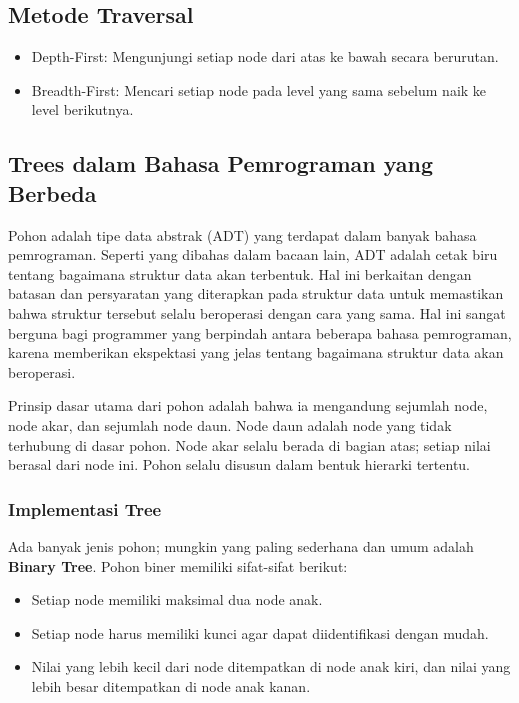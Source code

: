 \documentclass{article}
\begin{document}
\subsection{Metode Traversal}
\begin{itemize}
    \item Depth-First: Mengunjungi setiap node dari atas ke bawah secara berurutan.
    \item Breadth-First: Mencari setiap node pada level yang sama sebelum naik ke level berikutnya.
\end{itemize}

\subsection{Trees dalam Bahasa Pemrograman yang Berbeda}
Pohon adalah tipe data abstrak (ADT) yang terdapat dalam banyak bahasa pemrograman. Seperti yang dibahas dalam bacaan lain, ADT adalah cetak biru tentang bagaimana struktur data akan terbentuk. Hal ini berkaitan dengan batasan dan persyaratan yang diterapkan pada struktur data untuk memastikan bahwa struktur tersebut selalu beroperasi dengan cara yang sama. Hal ini sangat berguna bagi programmer yang berpindah antara beberapa bahasa pemrograman, karena memberikan ekspektasi yang jelas tentang bagaimana struktur data akan beroperasi.

Prinsip dasar utama dari pohon adalah bahwa ia mengandung sejumlah node, node akar, dan sejumlah node daun. Node daun adalah node yang tidak terhubung di dasar pohon. Node akar selalu berada di bagian atas; setiap nilai berasal dari node ini. Pohon selalu disusun dalam bentuk hierarki tertentu.

\subsubsection{Implementasi Tree}
Ada banyak jenis pohon; mungkin yang paling sederhana dan umum adalah \textbf{Binary Tree}. Pohon biner memiliki sifat-sifat berikut:
\begin{itemize}
    \item Setiap node memiliki maksimal dua node anak.
    \item Setiap node harus memiliki kunci agar dapat diidentifikasi dengan mudah.
    \item Nilai yang lebih kecil dari node ditempatkan di node anak kiri, dan nilai yang lebih besar ditempatkan di node anak kanan.
\end{itemize}
\end{document}

